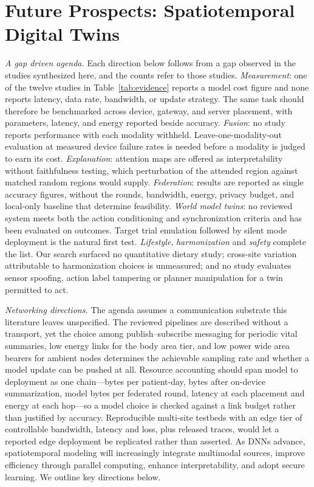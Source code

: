 \documentclass[journal]{IEEEtran}
\newif\ifsubmission
\begin{document}
\fi

\section{Future Prospects: Spatiotemporal Digital Twins}
\label{sec:future}
\ifsubmission
\emph{A gap driven agenda.} Each direction below follows from a gap observed in the studies synthesized here, and the counts refer to those studies. \emph{Measurement}: one of the twelve studies in Table~\ref{tab:evidence} reports a model cost figure and none reports latency, data rate, bandwidth, or update strategy. The same task should therefore be benchmarked across device, gateway, and server placement, with parameters, latency, and energy reported beside accuracy. \emph{Fusion}: no study reports performance with each modality withheld. Leave-one-modality-out evaluation at measured device failure rates is needed before a modality is judged to earn its cost. \emph{Explanation}: attention maps are offered as interpretability without faithfulness testing, which perturbation of the attended region against matched random regions would supply. \emph{Federation}: results are reported as single accuracy figures, without the rounds, bandwidth, energy, privacy budget, and local-only baseline that determine feasibility. \emph{World model twins}: no reviewed system meets both the action conditioning and synchronization criteria and has been evaluated on outcomes. Target trial emulation followed by silent mode deployment is the natural first test. \emph{Lifestyle}, \emph{harmonization} and \emph{safety} complete the list. Our search surfaced no quantitative dietary study; cross-site variation attributable to harmonization choices is unmeasured; and no study evaluates sensor spoofing, action label tampering or planner manipulation for a twin permitted to act.

\emph{Networking directions.} The agenda assumes a communication substrate this literature leaves unspecified. The reviewed pipelines are described without a transport, yet the choice among publish--subscribe messaging for periodic vital summaries, low energy links for the body area tier, and low power wide area bearers for ambient nodes determines the achievable sampling rate and whether a model update can be pushed at all. Resource accounting should span model to deployment as one chain---bytes per patient-day, bytes after on-device summarization, model bytes per federated round, latency at each placement and energy at each hop---so a model choice is checked against a link budget rather than justified by accuracy. Reproducible multi-site testbeds with an edge tier of controllable bandwidth, latency and loss, plus released traces, would let a reported edge deployment be replicated rather than asserted.
\else
As DNNs advance, spatiotemporal modeling will increasingly integrate multimodal sources, improve efficiency through parallel computing, enhance interpretability, and adopt secure learning. We outline key directions below.
\end{document}
